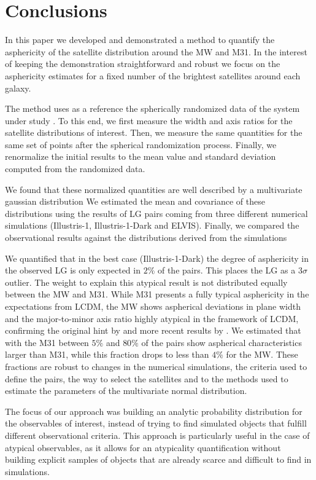 \documentclass[a4paper,fleqn,usenatbib]{mnras}
\begin{document}
\section{Conclusions}\label{sec:conclusions}

In this paper we developed and demonstrated a method to quantify the
asphericity of the satellite distribution around the MW and M31.  
In the interest of keeping the demonstration straightforward and robust we
focus on the asphericity estimates for a fixed number of the brightest
satellites around each galaxy. 

The method uses as a reference the spherically randomized data
of the system under study \citep{2017AN....338..854P}.  
To this end, we first measure the width and axis ratios for the satellite
distributions of interest. 
Then, we measure the same quantities for the same set of points after
the spherical randomization process.
Finally, we renormalize the initial results to the mean value and
standard deviation computed from the randomized data.  

We found that these normalized quantities are well described by
a multivariate gaussian distribution 
We estimated the mean and covariance of these distributions using
the results of LG pairs coming from three different numerical
simulations (Illustris-1, Illustris-1-Dark and ELVIS). 
Finally, we compared the observational results against the
distributions derived from the simulations

We quantified that in the best case (Illustris-1-Dark) the degree of
asphericity in the observed LG is only expected in $2\%$ of the
pairs. 
This places the LG as a $3\sigma$ outlier.   
The weight to explain this atypical result is not distributed equally
between the MW and M31. 
While M31 presents a fully typical asphericity in the expectations
from LCDM, the MW shows aspherical deviations in plane width and the
major-to-minor axis ratio highly atypical in the framework of LCDM,
confirming the original hint by \cite{2005A&A...431..517K} and more
recent results by \cite{2015ApJ...815...19P}. 
We estimated that with the M31 between $5\%$ and $80\%$ of the pairs
show aspherical characteristics larger than M31, while this fraction
drops to less than $4\%$ for the MW.  
These fractions are robust to changes in the numerical simulations,
the criteria used to define the pairs, the way to select the
satellites and to the methods used to estimate the parameters of the
multivariate normal distribution.


The focus of our approach was building an analytic probability
distribution for the observables of interest, instead of trying to
find simulated objects that fulfill different observational criteria. 
This approach is particularly useful in the case of atypical
observables, as it allows for an atypicality quantification without
building explicit samples of objects that are already scarce and
difficult to find in simulations.  
\end{document}
